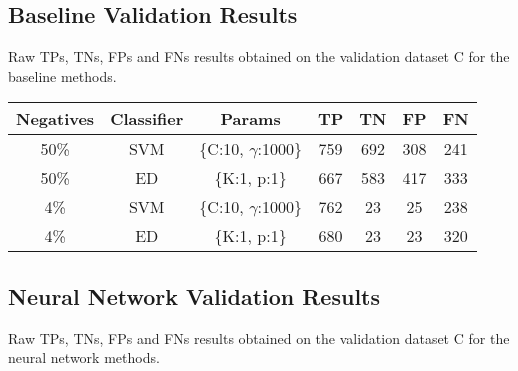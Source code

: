 \subsection{Baseline Validation Results}
\label{subsec:baseline-validation-results}

Raw \glspl{TP}, \glspl{TN}, \glspl{FP} and \glspl{FN} results obtained on the
validation dataset \gls{C} for the baseline methods.

\begin{adjustbox}{center}
    \begin{tabular}{|c|c|c|c|c|c|c|}
        \hline
        Negatives  & Classifier & Params                  & TP  & TN  & FP  & FN  \\ \hline
        50\%       & SVM        & \{C:10, $\gamma$:1000\} & 759 & 692 & 308 & 241 \\ \hline
        50\%       & ED         & \{K:1, p:1\}            & 667 & 583 & 417 & 333 \\ \hline
        4\%        & SVM        & \{C:10, $\gamma$:1000\} & 762 & 23  & 25  & 238 \\ \hline
        4\%        & ED         & \{K:1, p:1\}            & 680 & 23  & 23  & 320 \\ \hline
    \end{tabular}
\end{adjustbox}

\subsection{Neural Network Validation Results}
\label{subsec:neural-network-validation-results}

Raw \glspl{TP}, \glspl{TN}, \glspl{FP} and \glspl{FN} results obtained on the
validation dataset \gls{C} for the neural network methods.

